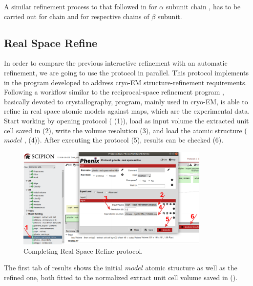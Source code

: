  A similar refinement process to that followed in \coot for  $\alpha$ subunit chain , has to be carried out for chain  and for respective chains of  $\beta$ subunit.\\
 
 
 \subsection*{\phenix Real Space Refine}
 
 In order to compare the previous \coot interactive refinement with an automatic refinement, we are going to use the
  protocol in parallel. This protocol implements in \scipion the  program developed to address cryo-EM structure-refinement requirements. Following a workflow similar to the \phenix reciprocal-space refinement program , basically devoted to crystallography,  program, mainly used in cryo-EM, is able to refine in real space atomic models against maps, which are the experimental data.\\
 
 Start working by opening  protocol ( (1)), load as input volume the extracted unit cell saved in \coot (2), write the volume resolution (3), and load the atomic structure ($model$ , (4)). After executing the protocol (5), results can be checked (6). 
 
 \begin{figure}[H]
  \centering 
  \captionsetup{width=.7\linewidth} 
  \includegraphics[width=0.85\textwidth]{Images/Fig29}
  \caption{Completing \phenix Real Space Refine protocol.}
  \label{fig:phenix_real_space_refine_protocol}
  \end{figure}
 
 The first tab of results shows the initial $model$ atomic structure as well as the refined one, both fitted to the normalized extract unit cell volume saved in \coot (). 
 
